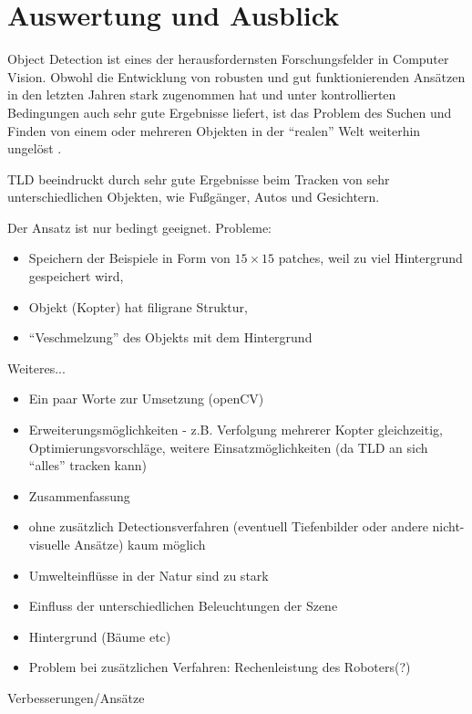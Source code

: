 \section{Auswertung und Ausblick}
Object Detection ist eines der herausfordernsten Forschungsfelder in Computer Vision. Obwohl die Entwicklung von robusten und gut funktionierenden Ansätzen in den letzten Jahren stark zugenommen hat und unter kontrollierten Bedingungen auch sehr gute Ergebnisse liefert, ist das Problem des Suchen und Finden von einem oder mehreren Objekten in der ``realen'' Welt weiterhin ungelöst \cite{ODS}.

TLD beeindruckt durch sehr gute Ergebnisse beim Tracken von sehr unterschiedlichen Objekten, wie Fußgänger, Autos und Gesichtern.

Der Ansatz ist nur bedingt geeignet. Probleme:
\begin{itemize}
\item Speichern der Beispiele in Form von $15\times15$ patches, weil zu viel Hintergrund gespeichert wird,
\item Objekt (Kopter) hat filigrane Struktur,
\item ``Veschmelzung'' des Objekts mit dem Hintergrund
\end{itemize}
Weiteres...
\begin{itemize}
\item Ein paar Worte zur Umsetzung (openCV)
\item Erweiterungsmöglichkeiten - z.B. Verfolgung mehrerer Kopter gleichzeitig, Optimierungsvorschläge, weitere Einsatzmöglichkeiten (da TLD an sich ``alles'' tracken kann)
\item Zusammenfassung
\item ohne zusätzlich Detectionsverfahren (eventuell Tiefenbilder oder andere nicht-visuelle Ansätze) kaum möglich
\item Umwelteinflüsse in der Natur sind zu stark
\item Einfluss der unterschiedlichen Beleuchtungen der Szene
\item Hintergrund (Bäume etc)
\item Problem bei zusätzlichen Verfahren: Rechenleistung des Roboters(?)
\end{itemize}
Verbesserungen/Ansätze
